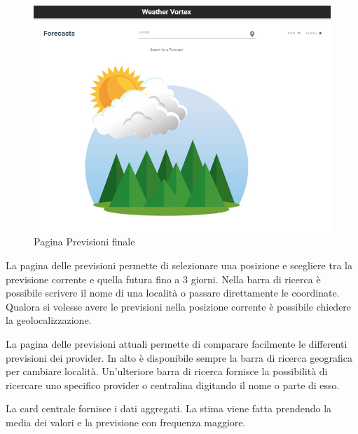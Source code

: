 \begin{figure}[H]
    \caption{Pagina Previsioni finale}
    \label{fig:imForecast}
    \centering
    \includegraphics[width=1\textwidth]{Images/ForecastIn.PNG}
\end{figure}
La pagina delle previsioni permette di selezionare una posizione e scegliere tra la previsione corrente e quella futura fino a 3 giorni. Nella barra di ricerca è possibile scrivere il nome di una località o passare direttamente le coordinate. Qualora si volesse avere le previsioni nella posizione corrente è possibile chiedere la geolocalizzazione.

La pagina delle previsioni attuali permette di comparare facilmente le differenti previsioni dei provider. In alto è disponibile sempre la barra di ricerca geografica per cambiare località. 
Un'ulteriore barra di ricerca fornisce la possibilità di ricercare uno specifico provider o centralina digitando il nome o parte di esso.

La card centrale fornisce i dati aggregati.  La stima viene fatta prendendo la media dei valori e la previsione con frequenza maggiore.

